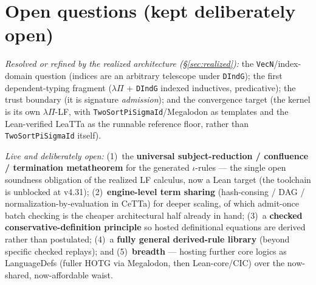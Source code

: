 \documentclass[11pt]{article}
\newcommand{\CeTTa}{CeTTa}
\newcommand{\HOTG}{HOTG}
\newcommand{\code}[1]{\texttt{#1}}
\begin{document}
\section{Open questions (kept deliberately open)}
\label{sec:open}
\emph{Resolved or refined by the realized architecture (\S\ref{sec:realized}):}
the \code{VecN}/index-domain question (indices are an arbitrary telescope under
\code{DIndG}); the first dependent-typing fragment ($\lambda\Pi$ + \code{DIndG}
indexed inductives, predicative); the trust boundary (it is signature
\emph{admission}); and the convergence target (the kernel is its own $\lambda\Pi$-LF,
with \code{TwoSortPiSigmaId}/Megalodon as templates and the Lean-verified LeaTTa as the
runnable reference floor, rather than \code{TwoSortPiSigmaId} itself).

\emph{Live and deliberately open:} (1)~the \textbf{universal subject-reduction /
confluence / termination metatheorem} for the generated $\iota$-rules --- the single
open soundness obligation of the realized LF calculus, now a Lean target (the
toolchain is unblocked at v4.31);
(2)~\textbf{engine-level term sharing} (hash-consing / DAG / normalization-by-evaluation
in \CeTTa{}) for deeper scaling, of which admit-once batch checking is the cheaper
architectural half already in hand; (3)~a \textbf{checked conservative-definition
principle} so hosted definitional equations are derived rather than postulated;
(4)~a \textbf{fully general derived-rule library} (beyond specific checked replays); and
(5)~\textbf{breadth} --- hosting further core logics as LanguageDefs (fuller \HOTG{}
via Megalodon, then Lean-core/CIC) over the now-shared, now-affordable waist.
\end{document}

